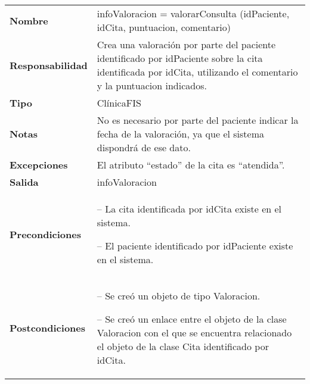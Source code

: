  \begin{table}[H]
  \centering
  \begin{tabularx}{\textwidth}{l|X}
    \textbf{Nombre}        &  infoValoracion = valorarConsulta (idPaciente,
    idCita, puntuacion, comentario) \\ 
    \textbf{Responsabilidad}  & Crea una valoración por parte del paciente
    identificado por idPaciente sobre la cita identificada por idCita,
    utilizando el comentario y la puntuacion indicados.  \\ 
    \textbf{Tipo}        &  ClínicaFIS \\ 
    \textbf{Notas}        & No es necesario por parte del paciente indicar la
    fecha de la valoración, ya que el sistema dispondrá de ese dato. \\
    \textbf{Excepciones}    & El atributo ``estado'' de la cita es ``atendida''.\\
    \textbf{Salida}        & infoValoracion\\ 
    \textbf{Precondiciones}    &
    \begin{itemizenomargins}
    \item[--] La cita identificada por idCita existe en el sistema.
    \item[--] El paciente identificado por idPaciente existe en el sistema.
    \end{itemizenomargins} \\ 
    \textbf{Postcondiciones}  &
    \begin{itemizenomargins}
    \item[--] Se creó un objeto de tipo Valoracion.
    \item[--] Se creó un enlace entre el objeto de la clase Valoracion con el que
      se encuentra relacionado el objeto de la clase Cita identificado por
      idCita.
      
    \end{itemizenomargins}

  \end{tabularx}
\end{table}
